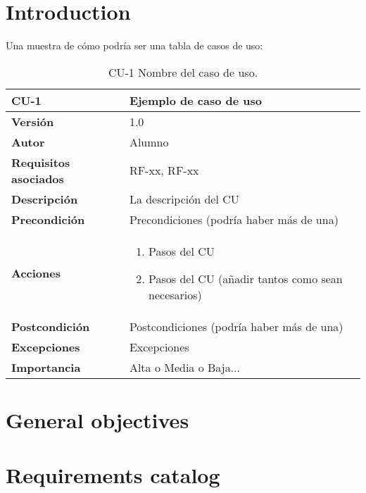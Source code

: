
\section{Introduction}

Una muestra de cómo podría ser una tabla de casos de uso:

\begin{table}[p]
	\centering
	\begin{tabularx}{\linewidth}{ p{} p{} }
		\toprule
		\textbf{CU-1}    & \textbf{Ejemplo de caso de uso}\\
		\toprule
		\textbf{Versión}              & 1.0    \\
		\textbf{Autor}                & Alumno \\
		\textbf{Requisitos asociados} & RF-xx, RF-xx \\
		\textbf{Descripción}          & La descripción del CU \\
		\textbf{Precondición}         & Precondiciones (podría haber más de una) \\
		\textbf{Acciones}             &
		\begin{enumerate}
			\def\labelenumi{\arabic{enumi}.}
			\tightlist
			\item Pasos del CU
			\item Pasos del CU (añadir tantos como sean necesarios)
		\end{enumerate}\\
		\textbf{Postcondición}        & Postcondiciones (podría haber más de una) \\
		\textbf{Excepciones}          & Excepciones \\
		\textbf{Importancia}          & Alta o Media o Baja... \\
		\bottomrule
	\end{tabularx}
	\caption{CU-1 Nombre del caso de uso.}
\end{table}

\section{General objectives}

\section{Requirements catalog}
